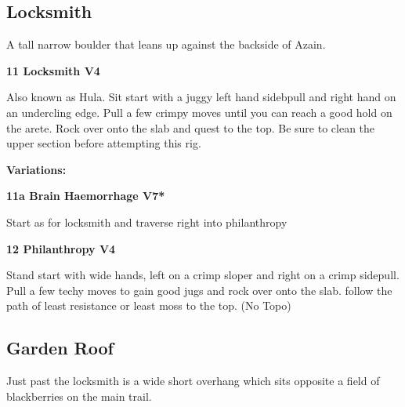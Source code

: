 \begin{multicols}{2}
\needspace{1.5cm}
\subsection*{Locksmith}\label{bf:Locksmith}
A tall narrow boulder that leans up against the backside of Azain.\\
	


\needspace{1.5cm}
\label{rt:Locksmith}
\colorbox{RoyalBlue!20}{
\parbox{0.95\linewidth}{
\textbf{
11 Locksmith V4  \warn\warn
}}}

\begin{adjustwidth}{0.5cm}{}			
Also known as Hula. Sit start with a juggy left hand sidebpull and right hand on an undercling edge. Pull a few crimpy moves until you can reach a good hold on the arete. Rock over onto the slab and quest to the top. Be sure to clean the upper section before attempting this rig.
\end{adjustwidth}

\begin{adjustwidth}{0.5cm}{}				
\needspace{3cm}
\textbf{Variations:} \newline

\needspace{1.5cm}
\label{vr:Brain Haemorrhage}
\colorbox{Goldenrod!50}{
\parbox{0.95\linewidth}{
\textbf{
11a Brain Haemorrhage V7*  
}}}

\begin{adjustwidth}{0.5cm}{}			
Start as for locksmith and traverse right into philanthropy
\end{adjustwidth}


\end{adjustwidth}


\needspace{1.5cm}
\label{rt:Philanthropy}
\colorbox{RoyalBlue!20}{
\parbox{0.95\linewidth}{
\textbf{
12 Philanthropy V4  \warn\warn
}}}

\begin{adjustwidth}{0.5cm}{}			
Stand start with wide hands, left on a crimp sloper and right on a crimp sidepull. Pull a few techy moves to gain good jugs and rock over onto the slab. follow the path of least resistance or least moss to the top. (No Topo)
\end{adjustwidth}




\needspace{1.5cm}
\subsection*{Garden Roof}\label{bf:Garden Roof}
Just past the locksmith is a wide short overhang which sits opposite a field of blackberries on the main trail.\\
	



\end{multicols}

